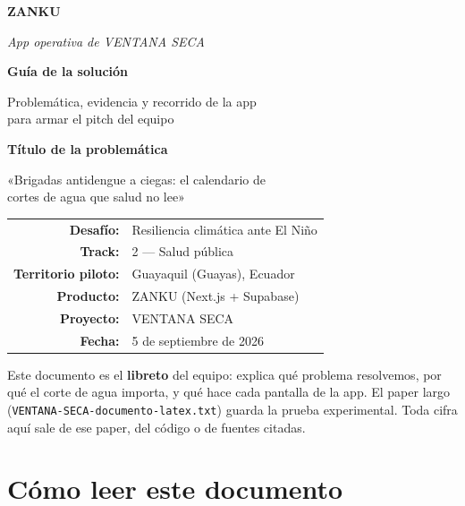 \documentclass[11pt,a4paper]{article}
\begin{document}
\begin{titlepage}
\centering
\vspace*{1.5cm}
{\Huge\bfseries\color{azulvs} ZANKU\par}
\vspace{0.4cm}
{\large\textit{App operativa de VENTANA SECA}\par}
\vspace{0.8cm}
{\LARGE\bfseries Guía de la solución\par}
\vspace{0.35cm}
{\large\color{grisvs} Problemática, evidencia y recorrido de la app\\
para armar el pitch del equipo\par}
\vspace{1.2cm}
{\large\textbf{Título de la problemática}\par}
\vspace{0.2cm}
{\large\color{grisvs} «Brigadas antidengue a ciegas: el calendario de\\
cortes de agua que salud no lee»\par}
\vspace{1.5cm}
\begin{tabular}{rl}
\textbf{Desafío:} & Resiliencia climática ante El Niño\\
\textbf{Track:} & 2 --- Salud pública\\
\textbf{Territorio piloto:} & Guayaquil (Guayas), Ecuador\\
\textbf{Producto:} & ZANKU (Next.js + Supabase)\\
\textbf{Proyecto:} & VENTANA SECA\\
\textbf{Fecha:} & 5 de septiembre de 2026\\
\end{tabular}
\vfill
{\small\color{grisvs}
Este documento es el \textbf{libreto} del equipo: explica qué problema
resolvemos, por qué el corte de agua importa, y qué hace cada pantalla
de la app. El paper largo (\texttt{VENTANA-SECA-documento-latex.txt})
guarda la prueba experimental. Toda cifra aquí sale de ese paper, del
código o de fuentes citadas.\par}
\end{titlepage}

\tableofcontents
\newpage

\section{Cómo leer este documento}
\end{document}
